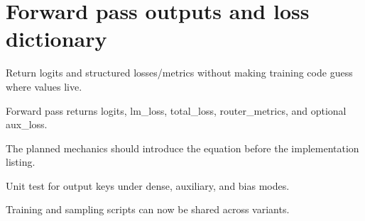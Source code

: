 \section{Forward pass outputs and loss dictionary}
\label{sec:ch10-forward-pass-outputs-and-loss-dictionary}

Return logits and structured losses/metrics without making training code guess where values live.



Forward pass returns logits, lm\_loss, total\_loss, router\_metrics, and optional aux\_loss.



The planned mechanics should introduce the equation before the implementation listing.





\begin{checkpointbox}
Unit test for output keys under dense, auxiliary, and bias modes.
\end{checkpointbox}

Training and sampling scripts can now be shared across variants.
